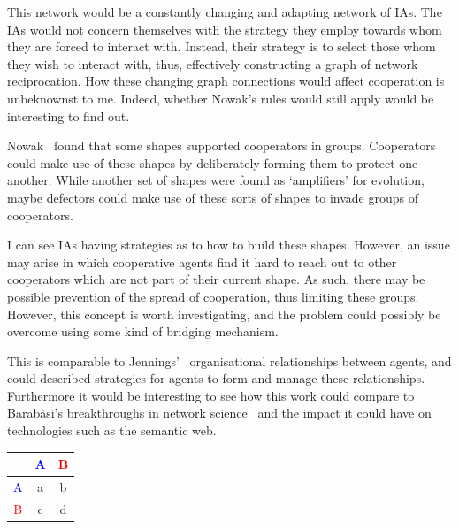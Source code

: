 \documentclass[]{final_report}
\begin{document}
This network would be a constantly changing and adapting network of IAs. The IAs would not concern themselves with the strategy they employ towards whom they are forced to interact with. Instead, their strategy is to select those whom they wish to interact with, thus, effectively constructing a graph of network reciprocation. How these changing graph connections would affect cooperation is unbeknownst to me. Indeed, whether Nowak's rules would still apply would be interesting to find out.\par
Nowak~\cite{nowak2006evolutionary} found that some shapes supported cooperators in groups. Cooperators could make use of these shapes by deliberately forming them to protect one another. While another set of shapes were found as `amplifiers' for evolution, maybe defectors could make use of these sorts of shapes to invade groups of cooperators.\par
I can see IAs having strategies as to how to build these shapes. However, an issue may arise in which cooperative agents find it hard to reach out to other cooperators which are not part of their current shape. As such, there may be possible prevention of the spread of cooperation, thus limiting these groups. However, this concept is worth investigating, and the problem could possibly be overcome using some kind of bridging mechanism.\par 
This is comparable to Jennings'~\cite{jennings2000agent} organisational relationships between agents, and could described strategies for agents to form and manage these relationships. Furthermore it would be interesting to see how this work could compare to Barab\`asi's breakthroughs in network science~\cite{barabasi1999emergence} and the impact it could have on technologies such as the semantic web.
\begin{framed}
	\begin{center}
		\begin{tabular}{c|cc}
		& \textcolor{blue}{A} & \textcolor{red}{B}\\	
		\hline
		\textcolor{blue}{A} & a & b\\
		\textcolor{red}{B} & c & d\\
		\end{tabular}
		\label{tab:networkmatrix}
	\end{center}	
\end{framed}
\end{document}
